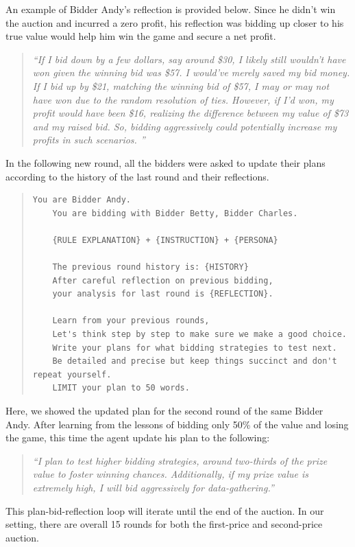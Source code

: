 \documentclass{article} %
\begin{document}
An example of Bidder Andy's reflection is provided below. Since he didn't win the auction and incurred a zero profit, his reflection was bidding up closer to his true value would help him win the game and secure a net profit.
\begin{quote}
   \textit{ ``If I bid down by a few dollars, say around \$30, I likely still wouldn't have won given the winning bid was \$57. I would've merely saved my bid money. If I bid up by \$21, matching the winning bid of \$57, I may or may not have won due to the random resolution of ties. However, if I'd won, my profit would have been \$16, realizing the difference between my value of \$73 and my raised bid. So, bidding aggressively could potentially increase my profits in such scenarios. ''}
\end{quote}

In the following new round, all the bidders were asked to update their plans according to the history of the last round and their reflections.
\begin{quote}
\begin{lstlisting}[basicstyle=\ttfamily]
    You are Bidder Andy.            
    You are bidding with Bidder Betty, Bidder Charles.     
    
    {RULE EXPLANATION} + {INSTRUCTION} + {PERSONA} 

    The previous round history is: {HISTORY}
    After careful reflection on previous bidding,
    your analysis for last round is {REFLECTION}. 
    
    Learn from your previous rounds, 
    Let's think step by step to make sure we make a good choice. 
    Write your plans for what bidding strategies to test next.
    Be detailed and precise but keep things succinct and don't repeat yourself. 
    LIMIT your plan to 50 words. 
\end{lstlisting}
\end{quote}

Here, we showed the updated plan for the second round of the same Bidder Andy. After learning from the lessons of bidding only 50\% of the value and losing the game, this time the agent update his plan to the following:
\begin{quote}
   \textit{ ``I plan to test higher bidding strategies, around two-thirds of the prize value to foster winning chances. Additionally, if my prize value is extremely high, I will bid aggressively for data-gathering.''}
\end{quote}

This plan-bid-reflection loop will iterate until the end of the auction. 
In our setting, there are overall 15 rounds for both the first-price and second-price auction.
\end{document}
